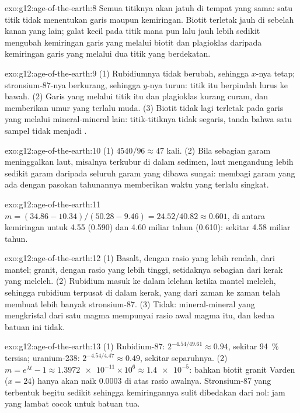 \begin{solution}{exo:g12:age-of-the-earth:8}
Semua titiknya akan jatuh di tempat yang sama: satu titik tidak menentukan
garis maupun kemiringan. Biotit terletak jauh di sebelah kanan yang lain;
galat kecil pada titik mana pun lalu jauh lebih sedikit mengubah kemiringan
garis yang melalui biotit dan plagioklas daripada kemiringan garis yang
melalui dua titik yang berdekatan.
\end{solution}

\begin{solution}{exo:g12:age-of-the-earth:9}
(1) Rubidiumnya tidak berubah, sehingga $x$-nya tetap; stronsium-87-nya
berkurang, sehingga $y$-nya turun: titik itu berpindah lurus ke bawah. (2) Garis
yang melalui titik itu dan plagioklas kurang curam, dan memberikan umur yang
terlalu muda. (3) Biotit tidak lagi terletak pada garis yang melalui
mineral-mineral lain: titik-titiknya tidak segaris, tanda bahwa satu sampel
tidak menjadi .
\end{solution}

\begin{solution}{exo:g12:age-of-the-earth:10}
(1) $4540/96 \approx 47$ kali. (2) Bila sebagian garam meninggalkan laut,
misalnya terkubur di dalam sedimen, laut mengandung lebih sedikit garam daripada
seluruh garam yang dibawa sungai: membagi garam yang ada dengan pasokan
tahunannya memberikan waktu yang terlalu singkat.
\end{solution}

\begin{solution}{exo:g12:age-of-the-earth:11}
$m = (34.86 - 10.34)/(50.28 - 9.46) = 24.52/40.82 \approx 0.601$, di antara
kemiringan untuk 4.55 (0.590) dan 4.60 miliar tahun (0.610): sekitar 4.58
miliar tahun.
\end{solution}

\begin{solution}{exo:g12:age-of-the-earth:12}
(1) Basalt, dengan rasio yang lebih rendah, dari mantel; granit, dengan rasio
yang lebih tinggi, setidaknya sebagian dari kerak yang meleleh. (2) Rubidium
masuk ke dalam lelehan ketika mantel meleleh, sehingga rubidium terpusat di
dalam kerak, yang dari zaman ke zaman telah membuat lebih banyak stronsium-87.
(3) Tidak: mineral-mineral yang mengkristal dari satu magma mempunyai rasio
awal magma itu, dan kedua batuan ini tidak.
\end{solution}

\begin{solution}{exo:g12:age-of-the-earth:13}
(1) Rubidium-87: $2^{-4.54/49.61} \approx 0.94$, sekitar \qty{94}{\percent}
tersisa; uranium-238: $2^{-4.54/4.47} \approx 0.49$, sekitar separuhnya. (2) $m =
e^{\lambda t} - 1 \approx \num{1.3972e-11} \times 10^6 \approx
\num{1.4e-5}$: bahkan biotit granit Varden ($x = 24$) hanya akan naik
$0.0003$ di atas rasio awalnya. Stronsium-87 yang terbentuk begitu sedikit
sehingga kemiringannya sulit dibedakan dari nol: jam yang lambat cocok untuk
batuan tua.
\end{solution}

